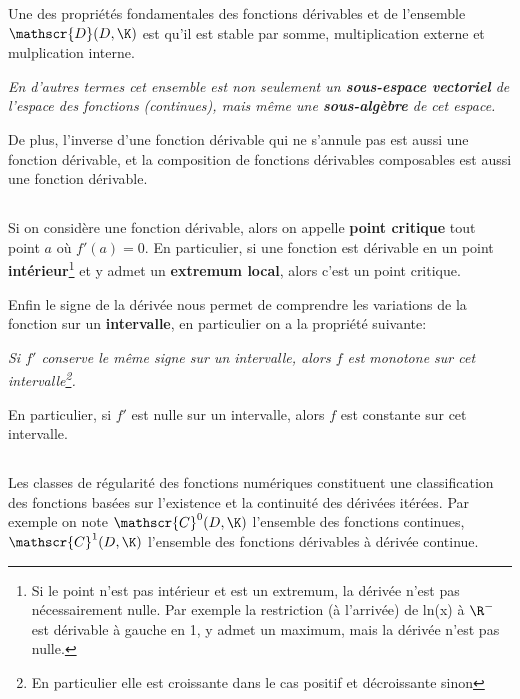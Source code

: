 Une des propriétés fondamentales des fonctions dérivables et de l'ensemble \(\mathscr{D}(D, \K)\) est qu'il est stable par somme, multiplication externe et mulplication interne.
\begin{center}
   \textit{
      En d'autres termes cet ensemble est non seulement un \textbf{sous-espace vectoriel} de l'espace des fonctions (continues), mais même une \textbf{sous-algèbre} de cet espace.
   }
\end{center}
De plus, l'inverse d'une fonction dérivable qui ne s'annule pas est aussi une fonction dérivable, et la composition de fonctions dérivables composables est aussi une fonction dérivable.

\subsection*{}

Si on considère une fonction dérivable, alors on appelle \textbf{point critique} tout point \(a\) où \(f'(a) = 0\).\+
En particulier, si une fonction est dérivable en un point \textbf{intérieur}\footnote[1]{Si le point n'est pas intérieur et est un extremum, la dérivée n'est pas nécessairement nulle. Par exemple la restriction (à l'arrivée) de ln(x) à \(\R^-\) est dérivable à gauche en 1, y admet un maximum, mais la dérivée n'est pas nulle.} et y admet un \textbf{extremum local}, alors c'est un point critique.\<

Enfin le signe de la dérivée nous permet de comprendre les variations de la fonction sur un \textbf{intervalle}, en particulier on a la propriété suivante:
\begin{center}
   \textit{Si \(f'\) conserve le même signe sur un intervalle, alors \(f\) est monotone sur cet intervalle\footnote[2]{En particulier elle est croissante dans le cas positif et décroissante sinon}.}
\end{center}
En particulier, si \(f'\) est nulle sur un intervalle, alors \(f\) est constante sur cet intervalle.
\pagebreak 

\subsection*{}

Les classes de régularité des fonctions numériques constituent une classification des fonctions basées sur l'existence et la continuité des dérivées itérées.
Par exemple on note \(\mathscr{C}^0(D, \K)\) l'ensemble des fonctions continues, \(\mathscr{C}^1(D, \K)\) l'ensemble des fonctions dérivables à dérivée continue.\<

